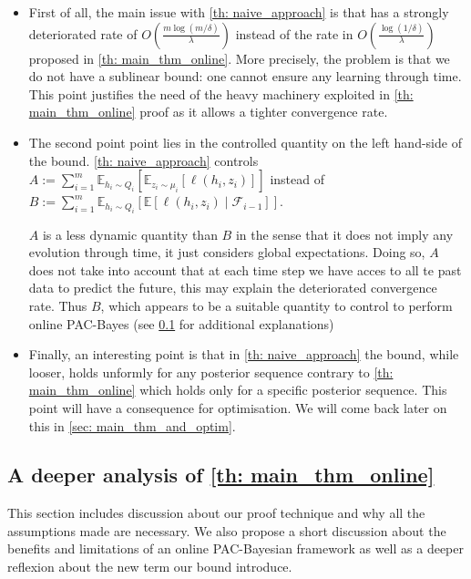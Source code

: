 \begin{itemize}
  \item First of all, the main issue with \cref{th: naive_approach} is that has a strongly deteriorated rate of $O\left(\frac{m\log(m/\delta)}{\lambda} \right)$ instead of the rate in  $O\left(\frac{\log(1/\delta)}{\lambda} \right)$ proposed in \cref{th: main_thm_online}.
  More precisely, the problem is that we do not have a sublinear bound: one cannot ensure any learning through time.
  This point justifies the need of the heavy machinery exploited in \cref{th: main_thm_online} proof as it allows a tighter convergence rate.
  \item The second point point lies in the controlled quantity on the left hand-side of the bound. \cref{th: naive_approach} controls $A:=\sum_{i=1}^m \mathbb{E}_{h_i\sim Q_{i}}\left[ \mathbb{E}_{z_i\sim \mu_i}[\ell(h_i,z_i)]    \right]$
  instead of $B:=\sum_{i=1}^m \mathbb{E}_{h_i\sim Q_{i}}\left[ \mathbb{E}[\ell(h_i,z_i) \mid \mathcal{F}_{i-1}]    \right]$.

  $A$ is a less dynamic quantity than $B$ in the sense that it does not imply any evolution through time, it just considers global expectations. Doing so, $A$ does not take into account that at each time step we have acces to all te past data to predict the future, this may explain the deteriorated convergence rate. Thus $B$, which appears to be a suitable quantity to control to perform online PAC-Bayes (see \cref{sec: deeper_analysis_main_thm} for additional explanations)

  \item Finally, an interesting point is that in \cref{th: naive_approach} the bound, while looser, holds unformly for any posterior sequence contrary to \cref{th: main_thm_online} which holds only for a specific posterior sequence. This point will have a consequence for optimisation. We will come back later on this in \cref{sec: main_thm_and_optim}.
\end{itemize}




\subsection{A deeper analysis of \cref{th: main_thm_online}}
\label{sec: deeper_analysis_main_thm}

This section includes discussion about our proof technique and why all the assumptions made are necessary. We also propose a short discussion about the benefits and limitations of an online PAC-Bayesian framework as well as a deeper reflexion about the new term our bound introduce.


